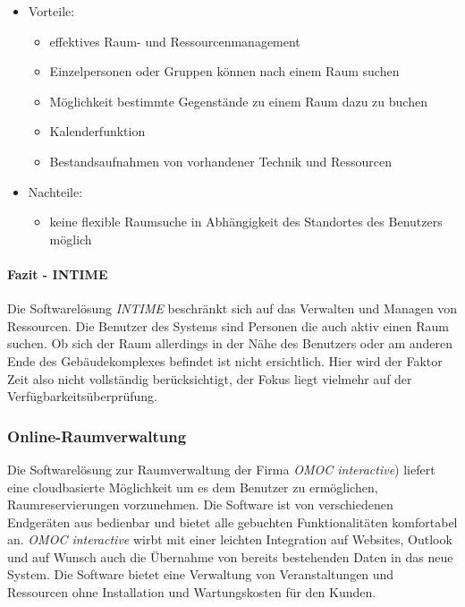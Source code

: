 \begin{itemize}
	\item Vorteile:
		\begin{itemize}
			\item effektives Raum- und Ressourcenmanagement
			\item Einzelpersonen oder Gruppen können nach einem Raum suchen
			\item Möglichkeit bestimmte Gegenstände zu einem Raum dazu zu buchen
			\item Kalenderfunktion
			\item Bestandsaufnahmen von vorhandener Technik und Ressourcen
		\end{itemize}
	\item Nachteile:
		\begin{itemize}
			\item keine flexible Raumsuche in Abhängigkeit des Standortes des Benutzers möglich
		\end{itemize}
\end{itemize}

\paragraph{Fazit - INTIME}
\label{sec:Fazit_INTIME}

Die Softwarelösung \textit{INTIME} beschränkt sich auf das Verwalten und Managen von
Ressourcen. Die Benutzer des Systems sind Personen die auch aktiv einen Raum
suchen. Ob sich der Raum allerdings in der Nähe des Benutzers oder am anderen
Ende des Gebäudekomplexes befindet ist nicht ersichtlich. Hier wird der Faktor
Zeit also nicht vollständig berücksichtigt, der Fokus liegt vielmehr auf der
Verfügbarkeitsüberprüfung.

\subsubsection{Online-Raumverwaltung}
\label{sec:Online-Raumverwaltung}

Die Softwarelösung zur Raumverwaltung der Firma \textit{OMOC interactive}) liefert eine
cloudbasierte Möglichkeit um es dem Benutzer zu ermöglichen, Raumreservierungen
vorzunehmen. Die Software ist von verschiedenen Endgeräten aus bedienbar und
bietet alle gebuchten Funktionalitäten komfortabel an. \textit{OMOC interactive} wirbt
mit einer leichten Integration auf Websites, Outlook und auf Wunsch auch die
Übernahme von bereits bestehenden Daten in das neue System. Die Software bietet
eine Verwaltung von Veranstaltungen und Ressourcen ohne Installation und
Wartungskosten für den Kunden.

